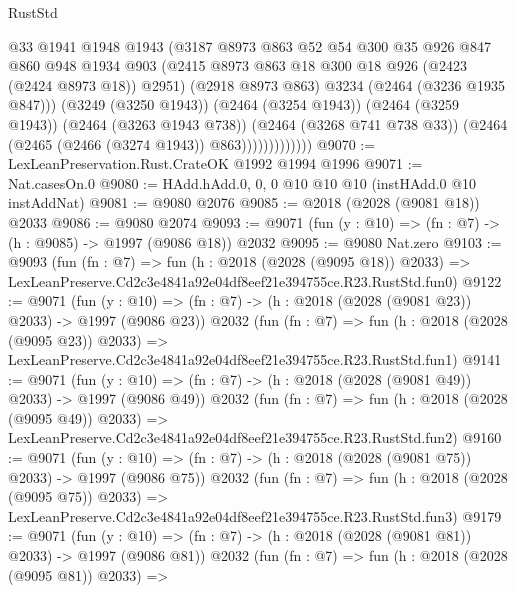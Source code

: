 \begin{lexlean}{RustStd}
\begin{coremodule}
                          @33
                          @1941
                          @1948
                          @1943
                          (@3187
                            @8973
                            @863
                            @52
                            @54
                            @300
                            @35
                            @926
                            @847
                            @860
                            @948
                            @1934
                            @903
                            (@2415 @8973 @863 @18 @300 @18 @926 (@2423 (@2424 @8973 @18)) @2951)
                            (@2918 @8973 @863)
                            @3234
                            (@2464 (@3236 @1935 @847)))
                          (@3249 (@3250 @1943))
                          (@2464 (@3254 @1943))
                          (@2464 (@3259 @1943))
                          (@2464 (@3263 @1943 @738))
                          (@2464 (@3268 @741 @738 @33))
                          (@2464 (@2465 (@2466 (@3274 @1943)) @863)))))))))))))
@9070 := LexLeanPreservation.Rust.CrateOK @1992 @1994 @1996
@9071 := Nat.casesOn.{0}
@9080 := HAdd.hAdd.{0, 0, 0} @10 @10 @10 (instHAdd.{0} @10 instAddNat)
@9081 := @9080 @2076
@9085 := @2018 (@2028 (@9081 @18)) @2033
@9086 := @9080 @2074
@9093 := @9071 (fun (y : @10) => (fn : @7) -> (h : @9085) -> @1997 (@9086 @18)) @2032
@9095 := @9080 Nat.zero
@9103 := @9093
    (fun (fn : @7) =>
    fun (h : @2018 (@2028 (@9095 @18)) @2033) =>
    LexLeanPreserve.Cd2c3e4841a92e04df8eef21e394755ce.R23.RustStd.fun0)
@9122 := @9071
    (fun (y : @10) => (fn : @7) -> (h : @2018 (@2028 (@9081 @23)) @2033) -> @1997 (@9086 @23))
    @2032
    (fun (fn : @7) =>
    fun (h : @2018 (@2028 (@9095 @23)) @2033) =>
    LexLeanPreserve.Cd2c3e4841a92e04df8eef21e394755ce.R23.RustStd.fun1)
@9141 := @9071
    (fun (y : @10) => (fn : @7) -> (h : @2018 (@2028 (@9081 @49)) @2033) -> @1997 (@9086 @49))
    @2032
    (fun (fn : @7) =>
    fun (h : @2018 (@2028 (@9095 @49)) @2033) =>
    LexLeanPreserve.Cd2c3e4841a92e04df8eef21e394755ce.R23.RustStd.fun2)
@9160 := @9071
    (fun (y : @10) => (fn : @7) -> (h : @2018 (@2028 (@9081 @75)) @2033) -> @1997 (@9086 @75))
    @2032
    (fun (fn : @7) =>
    fun (h : @2018 (@2028 (@9095 @75)) @2033) =>
    LexLeanPreserve.Cd2c3e4841a92e04df8eef21e394755ce.R23.RustStd.fun3)
@9179 := @9071
    (fun (y : @10) => (fn : @7) -> (h : @2018 (@2028 (@9081 @81)) @2033) -> @1997 (@9086 @81))
    @2032
    (fun (fn : @7) =>
    fun (h : @2018 (@2028 (@9095 @81)) @2033) =>

\end{coremodule}
\end{lexlean}
